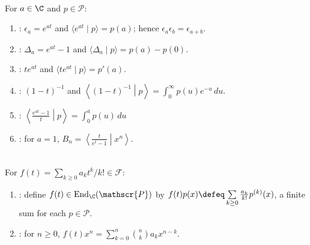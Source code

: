 \begin{definition} \label{def:umbral-functionals-basic-examples} \\
For $a\in\C$ and $p\in\mathscr{P}$:
\begin{enumerate}[label=(\roman*)]
\setlength{\itemsep}{0pt}
\item {}: $\epsilon_a=e^{at}$ and $\langle e^{at}\mid p\rangle=p(a)$; hence $\epsilon_a\epsilon_b=\epsilon_{a+b}$.
\item {}: $\Delta_a=e^{at}-1$ and $\langle \Delta_a\mid p\rangle=p(a)-p(0)$.
\item {}: $te^{at}$ and $\langle te^{at}\mid p\rangle=p'(a)$.
\item {}: $(1-t)^{-1}$ and $\left\langle(1-t)^{-1}\middle|p\right\rangle =\int_0^\infty p(u)e^{-u}\,du$.
\item {}: $\left\langle\frac{e^{at}-1}{t}\middle|p\right\rangle =\int_0^a p(u)\,du$
\item {}: for $a=1$, $B_n=\left\langle\frac{t}{e^t-1}\middle|x^n\right\rangle$.
\end{enumerate}
\end{definition}

\begin{definition} \label{def:formal-series-as-polynomial-operators} \\
For $f(t)=\sum_{k\geq0}a_kt^k/k!\in\mathscr{F}$:
\begin{enumerate}[label=(\roman*)]
\setlength{\itemsep}{0pt}
\item {}: define $f(t)\in\operatorname{End}_{\C}(\mathscr{P})$ by $f(t)p(x)\defeq\sum\limits_{k\geq0}\frac{a_k}{k!}p^{(k)}(x)$, a finite sum for each $p\in\mathscr{P}$.
\item {}: for $n\geq0$, $f(t)x^n=\sum\limits_{k=0}^{n}\binom{n}{k}a_kx^{n-k}$.
\end{enumerate}
\end{definition}

